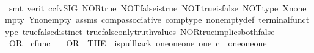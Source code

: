 \begin{isabellebody}
%
\isadelimproof
\ \ %
\endisadelimproof
%
\isatagproof
{}\isamarkupfalse%
\ {\isacharparenleft}{\kern0pt}smt\ {\isacharparenleft}{\kern0pt}verit{\isacharcomma}{\kern0pt}\ ccfv{\isacharunderscore}{\kern0pt}SIG{\isacharparenright}{\kern0pt}\ NOR{\isacharunderscore}{\kern0pt}true\ NOT{\isacharunderscore}{\kern0pt}false{\isacharunderscore}{\kern0pt}is{\isacharunderscore}{\kern0pt}true\ NOT{\isacharunderscore}{\kern0pt}true{\isacharunderscore}{\kern0pt}is{\isacharunderscore}{\kern0pt}false\ NOT{\isacharunderscore}{\kern0pt}type\ X{\isacharunderscore}{\kern0pt}nonempty\ Y{\isacharunderscore}{\kern0pt}nonempty\ assms{\isacharparenleft}{\kern0pt}{}{\isacharcomma}{\kern0pt}{}{\isacharparenright}{\kern0pt}\ comp{\isacharunderscore}{\kern0pt}associative{}\ comp{\isacharunderscore}{\kern0pt}type\ nonempty{\isacharunderscore}{\kern0pt}def\ terminal{\isacharunderscore}{\kern0pt}func{\isacharunderscore}{\kern0pt}type\ true{\isacharunderscore}{\kern0pt}false{\isacharunderscore}{\kern0pt}distinct\ true{\isacharunderscore}{\kern0pt}false{\isacharunderscore}{\kern0pt}only{\isacharunderscore}{\kern0pt}truth{\isacharunderscore}{\kern0pt}values\ NOR{\isacharunderscore}{\kern0pt}true{\isacharunderscore}{\kern0pt}implies{\isacharunderscore}{\kern0pt}both{\isacharunderscore}{\kern0pt}false{\isacharparenright}{\kern0pt}%
\endisatagproof
{\isafoldproof}%
%
\isadelimproof
%
\endisadelimproof
%
\isadelimdocument
%
\endisadelimdocument
%
\isatagdocument
%
\isamarkuptrue%
%
\endisatagdocument
{\isafolddocument}%
%
\isadelimdocument
%
\endisadelimdocument
{}\isamarkupfalse%
\ OR\ {\isacharcolon}{\kern0pt}{\isacharcolon}{\kern0pt}\ {\isachardoublequoteopen}cfunc{\isachardoublequoteclose}\ \isanewline
\ \ {\isachardoublequoteopen}OR\ {\isacharequal}{\kern0pt}\ {\isacharparenleft}{\kern0pt}THE\ {\isasymchi}{\isachardot}{\kern0pt}\ is{\isacharunderscore}{\kern0pt}pullback\ {\isacharparenleft}{\kern0pt}one{\isasymCoprod}{\isacharparenleft}{\kern0pt}one{\isasymCoprod}one{\isacharparenright}{\kern0pt}{\isacharparenright}{\kern0pt}\ one\ {\isacharparenleft}{\kern0pt}{\isasymOmega}{\isasymtimes}\isactrlsub c{\isasymOmega}{\isacharparenright}{\kern0pt}\ {\isasymOmega}\ {\isacharparenleft}{\kern0pt}{\isasymbeta}\isactrlbsub {\isacharparenleft}{\kern0pt}one{\isasymCoprod}{\isacharparenleft}{\kern0pt}one{\isasymCoprod}one{\isacharparenright}{\kern0pt}{\isacharparenright}{\kern0pt}\isactrlesub {\isacharparenright}{\kern0pt}\ {\isasymt}\ {\isacharparenleft}{\kern0pt}{\isasymlangle}{\isasymt}{\isacharcomma}{\kern0pt}\ {\isasymt}{\isasymrangle}{\isasymamalg}\ {\isacharparenleft}{\kern0pt}{\isasymlangle}{\isasymt}{\isacharcomma}{\kern0pt}\ {\isasymf}{\isasymrangle}\ {\isasymamalg}{\isasymlangle}{\isasymf}{\isacharcomma}{\kern0pt}\ {\isasymt}{\isasymrangle}{\isacharparenright}{\kern0pt}{\isacharparenright}{\kern0pt}\ {\isasymchi}{\isacharparenright}{\kern0pt}{\isachardoublequoteclose}\isanewline

\end{isabellebody}
